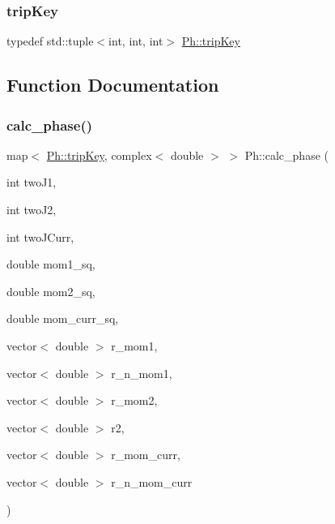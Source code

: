 \subsubsection{\texorpdfstring{tripKey}{tripKey}}
{\footnotesize\ttfamily typedef std\+::tuple$<$int, int, int$>$ \mbox{\hyperlink{namespacePh_afdd5bf3d7b37625115089ea3048e0cbb}{Ph\+::trip\+Key}}}



\subsection{Function Documentation}
\mbox{\label{namespacePh_a8662b8eefea46c114386b136878a461c}} 
\subsubsection{\texorpdfstring{calc\_phase()}{calc\_phase()}}
{\footnotesize\ttfamily map$<$ \mbox{\hyperlink{namespacePh_afdd5bf3d7b37625115089ea3048e0cbb}{Ph\+::trip\+Key}}, complex$<$ double $>$ $>$ Ph\+::calc\+\_\+phase (\begin{DoxyParamCaption}\item[{int}]{two\+J1,  }\item[{int}]{two\+J2,  }\item[{int}]{two\+J\+Curr,  }\item[{double}]{mom1\+\_\+sq,  }\item[{double}]{mom2\+\_\+sq,  }\item[{double}]{mom\+\_\+curr\+\_\+sq,  }\item[{vector$<$ double $>$}]{r\+\_\+mom1,  }\item[{vector$<$ double $>$}]{r\+\_\+n\+\_\+mom1,  }\item[{vector$<$ double $>$}]{r\+\_\+mom2,  }\item[{vector$<$ double $>$}]{r2,  }\item[{vector$<$ double $>$}]{r\+\_\+mom\+\_\+curr,  }\item[{vector$<$ double $>$}]{r\+\_\+n\+\_\+mom\+\_\+curr }\end{DoxyParamCaption})}

